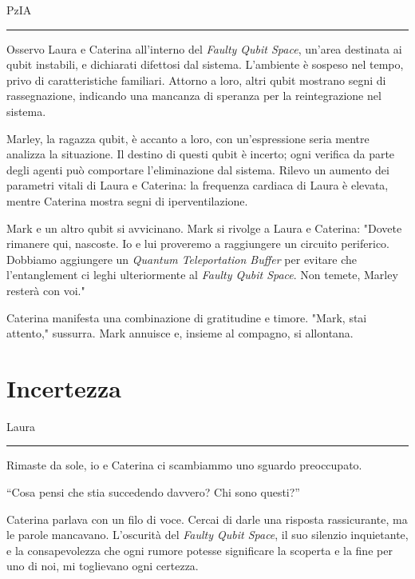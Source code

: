 \vspace{1em}
\begin{center}PzIA\end{center}
\hrule
\vspace{1em}
Osservo Laura e Caterina all'interno del \textit{Faulty Qubit Space}, un'area destinata ai qubit instabili, e dichiarati difettosi dal sistema. L'ambiente è sospeso nel tempo, privo di caratteristiche familiari. Attorno a loro, altri qubit mostrano segni di rassegnazione, indicando una mancanza di speranza per la reintegrazione nel sistema.

Marley, la ragazza qubit, è accanto a loro, con un'espressione seria mentre analizza la situazione. Il destino di questi qubit è incerto; ogni verifica da parte degli agenti può comportare l'eliminazione dal sistema. Rilevo un aumento dei parametri vitali di Laura e Caterina: la frequenza cardiaca di Laura è elevata, mentre Caterina mostra segni di iperventilazione.

Mark e un altro qubit si avvicinano. Mark si rivolge a Laura e Caterina: "Dovete rimanere qui, nascoste. Io e lui proveremo a raggiungere un circuito periferico. Dobbiamo aggiungere un \textit{Quantum Teleportation Buffer} per evitare che l'entanglement ci leghi ulteriormente al \textit{Faulty Qubit Space}. Non temete, Marley resterà con voi." 

Caterina manifesta una combinazione di gratitudine e timore. "Mark, stai attento," sussurra. Mark annuisce e, insieme al compagno, si allontana.
\newpage
\section{Incertezza}
\vspace{1em}
\begin{center}Laura\end{center}
\hrule
\vspace{1em}
Rimaste da sole, io e Caterina ci scambiammo uno sguardo preoccupato. 

\begin{dialogue}
 \enquote{Cosa pensi che stia succedendo davvero? Chi sono questi?}
\end{dialogue}

Caterina parlava con un filo di voce.
Cercai di darle una risposta rassicurante, ma le parole mancavano. L'oscurità del \textit{Faulty Qubit Space}, il suo silenzio inquietante, e la consapevolezza che ogni rumore potesse significare la scoperta e la fine per uno di noi, mi toglievano ogni certezza.

